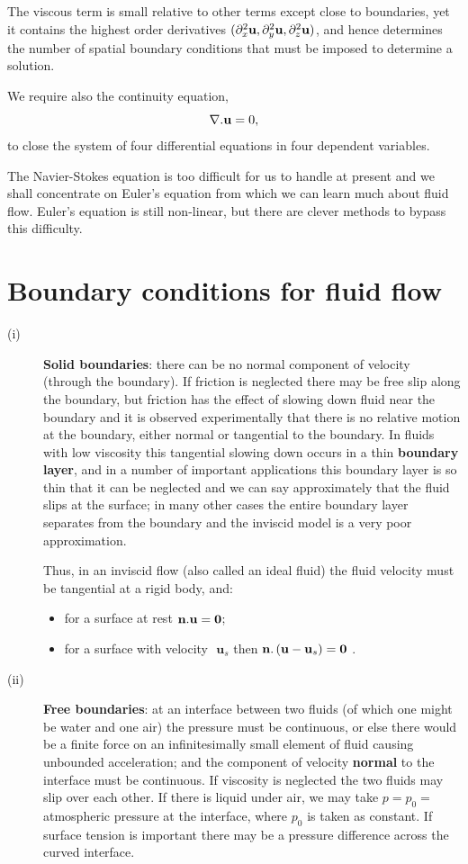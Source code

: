 \documentclass[10pt]{report}
\begin{document}
The viscous term is small relative to other terms except close to
boundaries, yet it contains the highest order derivatives $(\partial_x ^2{\rm
{\bf u}},\partial_y ^2{{\bf u}},\partial_z ^2{{\bf u}})$, and hence determines the
number of spatial boundary conditions that must be imposed to determine a
solution.

We require also the continuity equation,
\[
\nabla . {\bf u}=0,
\]
to close the system of four differential equations in four dependent
variables.

The Navier-Stokes equation is too difficult for us to handle at present and
we shall concentrate on Euler's equation from which we can learn much about
fluid flow. Euler's equation is still non-linear, but there are clever
methods to bypass this difficulty.

\section{Boundary conditions for fluid flow}
\begin{description}
\item[(i)] \textbf{Solid boundaries}: there can be no normal component of velocity
(through the boundary). If friction is neglected there may be free slip
along the boundary, but friction has the effect of slowing down fluid near
the boundary and it is observed experimentally that there is no relative
motion at the boundary, either normal or tangential to the boundary. In
fluids with low viscosity this tangential slowing down occurs in a thin
\textbf{boundary layer}, and in a number of important applications this
boundary layer is so thin that it can be neglected and we can say
approximately that the fluid slips at the surface; in many other cases the
entire boundary layer separates from the boundary and the inviscid model is
a very poor approximation.

Thus, in an inviscid flow (also called an ideal fluid) the fluid velocity
must be tangential at a rigid body, and:
\begin{itemize}
\item for a surface at rest ${{\bf n}}. {{\bf u}}={\rm
{\bf 0}}$;
\item for a surface with velocity $\textbf{ u}_{s }$ then ${{\bf n}}.
\left( {{{\bf u}}-{{\bf u}}_s } \right)={{\bf 0}}$ .
\end{itemize}
\item[(ii)] \textbf{Free boundaries}: at an interface between two fluids (of which
one might be water and one air) the pressure must be continuous, or else
there would be a finite force on an infinitesimally small element of fluid
causing unbounded acceleration; and the component of velocity
\textbf{normal} to the interface must be continuous. If viscosity is
neglected the two fluids may slip over each other. If there is liquid under
air, we may take $ p = p_{0}  = $atmospheric pressure at the interface, where
$p_{0}$ is taken as constant. If surface tension is important there may be a
pressure difference across the curved interface.
\end{description}
\end{document}
